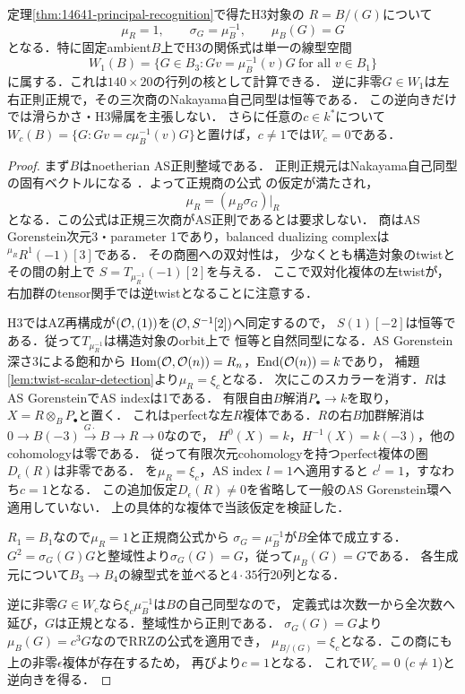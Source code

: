 \begin{theorem}[H3に対する単一のNakayama正規線型条件]
\label{thm:nakayama-cubic-linearization}
定理\ref{thm:14641-principal-recognition}で得たH3対象の
$R=B/(G)$について
\[
 \mu_R=1,\qquad \sigma_G=\mu_B^{-1},\qquad \mu_B(G)=G
\]
となる．特に固定ambient$B$上でH3の関係式は単一の線型空間
\[
 W_1(B)=\{G\in B_3:Gv=\mu_B^{-1}(v)G\ \text{for all }v\in B_1\}
\]
に属する．これは$140\times20$の行列の核として計算できる．
逆に非零$G\in W_1$は左右正則正規で，その三次商のNakayama自己同型は恒等である．
この逆向きだけでは滑らかさ・H3帰属を主張しない．
さらに任意の$c\in k^*$について
$W_c(B)=\{G:Gv=c\mu_B^{-1}(v)G\}$と置けば，$c\ne1$では$W_c=0$である．
\end{theorem}
\begin{proof}
まず$B$はnoetherian AS正則整域である．
正則正規元はNakayama自己同型の固有ベクトルになる
\cite[Proposition 2.3]{ZSL}．よって正規商の公式
\cite[Lemma 1.5]{RRZ}の仮定が満たされ，
\[
 \mu_R=(\mu_B\sigma_G)|_R
\]
となる．この公式は正規三次商がAS正則であるとは要求しない．
商はAS Gorenstein次元3・parameter 1であり，balanced dualizing complexは
${}^{\mu_R}R^1(-1)[3]$である．
その商圏への双対性\cite[Theorem 4.2, Corollary 4.3]{YZ}は，
少なくとも構造対象のtwistとその間の射上で
$S=T_{\mu_R^{-1}}(-1)[2]$を与える．
ここで双対化複体の左twistが，右加群のtensor関手では逆twistとなることに注意する．

H3ではAZ再構成が$(\mathcal O,(1))$を$(\mathcal O,S^{-1}[2])$へ同定するので，
$S(1)[-2]$は恒等である．従って$T_{\mu_R^{-1}}$は構造対象のorbit上で
恒等と自然同型になる．AS Gorenstein深さ3による飽和から
$\operatorname{Hom}(\mathcal O,\mathcal O(n))=R_n$，$\operatorname{End}(\mathcal O(n))=k$であり，
補題\ref{lem:twist-scalar-detection}より$\mu_R=\xi_c$となる．
次にこのスカラーを消す．$R$はAS GorensteinでAS indexは1である．
有限自由$B$解消$P_\bullet\to k$を取り，$X=R\otimes_B P_\bullet$と置く．
これはperfectな左$R$複体である．$R$の右$B$加群解消は
$0\to B(-3)\xrightarrow{G\cdot}B\to R\to0$なので，
$H^0(X)=k$，$H^{-1}(X)=k(-3)$，他のcohomologyは零である．
従って有限次元cohomologyを持つperfect複体の圏$D_\epsilon(R)$は非零である．
\cite[Theorem 4.1(2)]{RRZtri}を$\mu_R=\xi_c$，AS index $l=1$へ適用すると
$c^l=1$，すなわち$c=1$となる．
この追加仮定$D_\epsilon(R)\ne0$を省略して一般のAS Gorenstein環へ適用していない．
上の具体的な複体で当該仮定を検証した．

$R_1=B_1$なので$\mu_R=1$と正規商公式から
$\sigma_G=\mu_B^{-1}$が$B$全体で成立する．
$G^2=\sigma_G(G)G$と整域性より$\sigma_G(G)=G$，従って$\mu_B(G)=G$である．
各生成元について$B_3\to B_4$の線型式を並べると$4\cdot35$行20列となる．

逆に非零$G\in W_c$なら$\xi_c\mu_B^{-1}$は$B$の自己同型なので，
定義式は次数一から全次数へ延び，$G$は正規となる．整域性から正則である．
$\sigma_G(G)=G$より$\mu_B(G)=c^3G$なのでRRZの公式を適用でき，
$\mu_{B/(G)}=\xi_c$となる．この商にも上の非零$\epsilon$複体が存在するため，
再び\cite[Theorem 4.1(2)]{RRZtri}より$c=1$となる．
これで$W_c=0$ ($c\ne1$)と逆向きを得る．
\end{proof}

